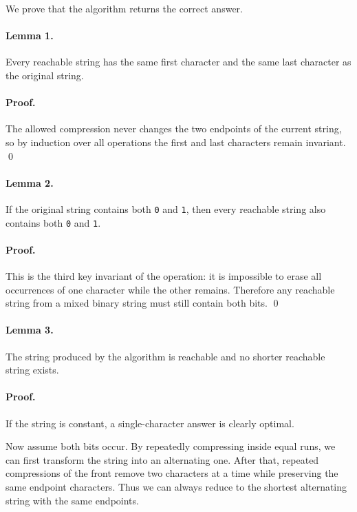 \documentclass[11pt]{article}
\begin{document}
We prove that the algorithm returns the correct answer.

\paragraph{Lemma 1.}
Every reachable string has the same first character and the same last character as the original
string.

\paragraph{Proof.}
The allowed compression never changes the two endpoints of the current string, so by induction
over all operations the first and last characters remain invariant. \qed

\paragraph{Lemma 2.}
If the original string contains both \texttt{0} and \texttt{1}, then every reachable string also contains
both \texttt{0} and \texttt{1}.

\paragraph{Proof.}
This is the third key invariant of the operation: it is impossible to erase all occurrences of one
character while the other remains. Therefore any reachable string from a mixed binary string must
still contain both bits. \qed

\paragraph{Lemma 3.}
The string produced by the algorithm is reachable and no shorter reachable string exists.

\paragraph{Proof.}
If the string is constant, a single-character answer is clearly optimal.

Now assume both bits occur. By repeatedly compressing inside equal runs, we can first transform
the string into an alternating one. After that, repeated compressions of the front remove two
characters at a time while preserving the same endpoint characters. Thus we can always reduce to
the shortest alternating string with the same endpoints.
\end{document}
